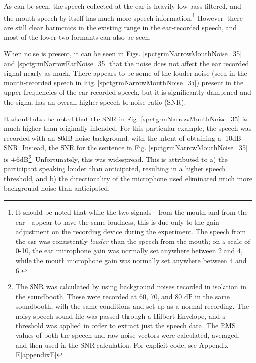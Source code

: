 \documentclass[dissertation,copyright]{uathesis}
\begin{document}
As can be seen, the speech collected at the ear is heavily low-pass filtered, and the mouth speech by itself has much more speech information.\footnote{It should be noted that while the two signals - from the mouth and from the ear - appear to have the same loudness, this is due only to the gain adjustment on the recording device during the experiment.  The speech from the ear was consistently \textit{louder} than the speech from the mouth; on a scale of 0-10, the ear microphone gain was normally set anywhere between 2 and 4, while the mouth microphone gain was normally set anywhere between 4 and 6.}
However, there are still clear harmonics in the existing range in the ear-recorded speech, and most of the lower two formants can also be seen.

When noise is present, it can be seen in Figs. \ref{spctgrmNarrowMouthNoise_35} and \ref{spctgrmNarrowEarNoise_35} that the noise does not affect the ear recorded signal nearly as much.  There appears to be some of the louder noise (seen in the mouth-recorded speech in Fig. \ref{spctgrmNarrowMouthNoise_35}) present in the upper frequencies of the ear recorded speech, but it is significantly dampened and the signal has an overall higher speech to noise ratio (SNR).

It should also be noted that the SNR in Fig. \ref{spctgrmNarrowMouthNoise_35} is much higher than originally intended.  For this particular example, the speech was recorded with an 80dB noise background, with the intent of obtaining a -10dB SNR.  Instead, the SNR for the sentence in Fig. \ref{spctgrmNarrowMouthNoise_35} is +6dB\footnote{The SNR was calculated by using background noises recorded in isolation in the soundbooth.  These were recorded at 60, 70, and 80 dB in the same soundbooth, with the same conditions and set up as a normal recording.  The noisy speech sound file was passed through a Hilbert Envelope, and a threshold was applied in order to extract just the speech data.  The RMS values of both the speech and raw noise vectors were calculated, averaged, and then used in the SNR calculation.  For explicit code, see Appendix E\ref{appendixE}}.  Unfortunately, this was widespread. This is attributed to a) the participant speaking louder than anticipated, resulting in a higher speech threshold, and b) the directionality of the microphone used eliminated much more background noise than anticipated.
\end{document}
